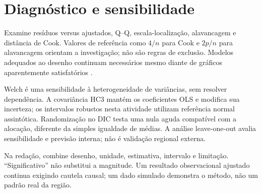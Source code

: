 \section{Diagnóstico e sensibilidade}
Examine resíduos versus ajustados, Q--Q, escala-localização, alavancagem e distância de Cook. Valores de referência como $4/n$ para Cook e $2p/n$ para alavancagem orientam a investigação; não são regras de exclusão. Modelos adequados ao desenho continuam necessários mesmo diante de gráficos aparentemente satisfatórios \parencite{zuur2010}.

Welch é uma sensibilidade à heterogeneidade de variâncias, sem resolver dependência. A covariância HC3 mantém os coeficientes OLS e modifica sua incerteza; os intervalos robustos nesta atividade utilizam referência normal assintótica. Randomização no DIC testa uma nula aguda compatível com a alocação, diferente da simples igualdade de médias. A análise leave-one-out avalia sensibilidade e previsão interna; não é validação regional externa.

\begin{dica}
Na redação, combine desenho, unidade, estimativa, intervalo e limitação. ``Significativo'' não substitui a magnitude. Um resultado observacional ajustado continua exigindo cautela causal; um dado simulado demonstra o método, não um padrão real da região.
\end{dica}
